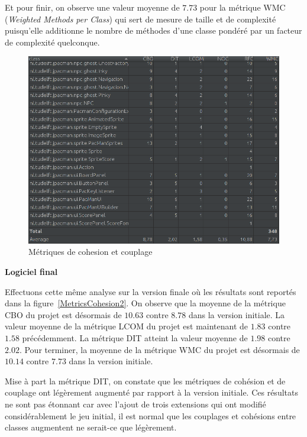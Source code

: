 \documentclass[12pt, openany]{report}
\begin{document}
Et pour finir, on observe une valeur moyenne de $7.73$ pour la métrique WMC (\textit{Weighted Methods per Class}) qui sert de mesure de taille et de complexité puisqu'elle additionne le nombre de méthodes d'une classe pondéré par un facteur de complexité quelconque.

\begin{figure}[!h]
	\centering
	\includegraphics[scale=0.6]{Images/MetricsCohesion1.png} 
	\caption{Métriques de cohesion et couplage}
	\label{MetricsCohesion1}
\end{figure}

\newpage
\textbf{Logiciel final}

Effectuons cette même analyse sur la version finale où les résultats sont reportés dans la figure~\ref{MetricsCohesion2}. On observe que la moyenne de la métrique CBO du projet est désormais de $10.63$ contre $8.78$ dans la version initiale. La valeur moyenne de la métrique LCOM du projet est maintenant de $1.83$ contre $1.58$ précédemment. La métrique DIT atteint la valeur moyenne de $1.98$ contre $2.02$. Pour terminer, la moyenne de la métrique WMC du projet est désormais de $10.14$ contre $7.73$ dans la version initiale.

Mise à part la métrique DIT, on constate que les métriques de cohésion et de couplage ont légèrement augmenté par rapport à la version initiale. Ces résultats ne sont pas étonnant car avec l'ajout de trois extensions qui ont modifié considérablement le jeu initial, il est normal que les couplages et cohésions entre classes augmentent ne serait-ce que légèrement.
\end{document}
